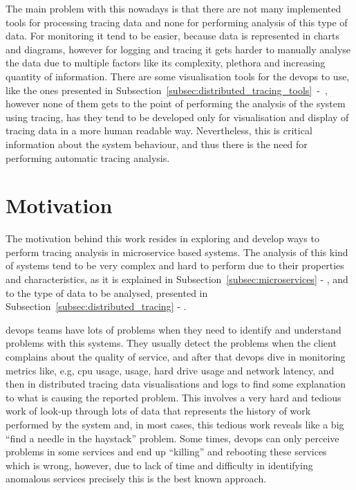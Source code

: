 The main problem with this nowadays is that there are not many implemented tools for processing tracing data and none for performing analysis of this type of data. For monitoring it tend to be easier, because data is represented in charts and diagrams, however for logging and tracing it gets harder to manually analyse the data due to multiple factors like its complexity, plethora and increasing quantity of information. There are some visualisation tools for the \gls{devops} to use, like the ones presented in Subsection~\ref{subsec:distributed_tracing_tools}~-~, however none of them gets to the point of performing the analysis of the system using tracing, has they tend to be developed only for visualisation and display of tracing data in a more human readable way. Nevertheless, this is critical information about the system behaviour, and thus there is the need for performing automatic tracing analysis.

\section{Motivation}
\label{sec:motivation}

The motivation behind this work resides in exploring and develop ways to perform tracing analysis in microservice based systems. The analysis of this kind of systems tend to be very complex and hard to perform due to their properties and characteristics, as it is explained in Subsection~\ref{subsec:microservices} - , and to the type of data to be analysed, presented in Subsection~\ref{subsec:distributed_tracing} - .

\gls{devops} teams have lots of problems when they need to identify and understand problems with this systems. They usually detect the problems when the client complains about the quality of service, and after that \gls{devops} dive in monitoring metrics like, e.g, \gls{cpu} usage, usage, hard drive usage and network latency, and then in distributed tracing data visualisations and logs to find some explanation to what is causing the reported problem. This involves a very hard and tedious work of look-up through lots of data that represents the history of work performed by the system and, in most cases, this tedious work reveals like a big ``find a needle in the haystack'' problem. Some times, \gls{devops} can only perceive problems in some services and end up ``killing'' and rebooting these services which is wrong, however, due to lack of time and difficulty in identifying anomalous services precisely this is the best known approach.

